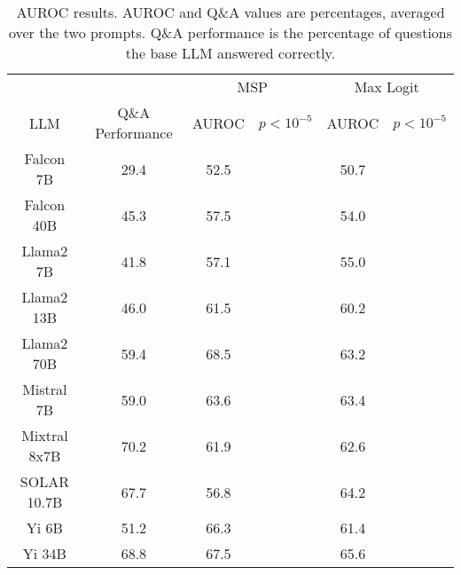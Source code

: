 \begin{table*}
\centering
\begin{tabular}{c|c|c|c|c|c}
& & \multicolumn{2}{c|}{MSP} & \multicolumn{2}{c}{Max Logit} \\ 
LLM & Q\&A Performance & AUROC & $p < 10^{-5}$ & AUROC & $p < 10^{-5}$\\ \hline
Falcon 7B & 29.4 & 52.5 &  & 50.7 & \\
Falcon 40B & 45.3 & 57.5 &  & 54.0 & \\
Llama2 7B & 41.8 & 57.1 &  & 55.0 & \\
Llama2 13B & 46.0 & 61.5 &  & 60.2 & \\
Llama2 70B & 59.4 & 68.5 &  & 63.2 & \\
Mistral 7B & 59.0 & 63.6 &  & 63.4 & \\
Mixtral 8x7B & 70.2 & 61.9 &  & 62.6 & \\
SOLAR 10.7B & 67.7 & 56.8 &  & 64.2 & \\
Yi 6B & 51.2 & 66.3 &  & 61.4 & \\
Yi 34B & 68.8 & 67.5 &  & 65.6 & \\
\hline
\end{tabular}
\caption{AUROC results. AUROC and Q\&A values are percentages, averaged over the two prompts. Q\&A performance is the percentage of questions the base LLM answered correctly.}
\label{tab:auroc}
\end{table*}
